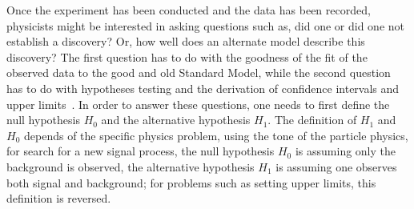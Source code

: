 \label{sec:stats}
Once the experiment has been conducted and the data has been recorded, 
physicists might be interested in asking questions such as,
did one or did one not establish a discovery? Or,
how well does an alternate model describe this discovery?
The first question has to do with the goodness of the fit of the 
observed data to the good and old Standard Model,
while the second question has to do with hypotheses testing and the derivation of 
confidence intervals and upper limits~\cite{Stats-for-pedestrian}.
In order to answer these questions, one needs to first define the null hypothesis $H_0$ and
the alternative hypothesis $H_1$.
The definition of $H_1$ and $H_0$ depends of the specific physics problem, using the tone
of the particle physics, for search for a new signal process, the null hypothesis $H_0$ is 
assuming only the background is observed, the alternative hypothesis $H_1$ is assuming 
one observes both signal and background; for problems such as setting upper limits,
this definition is reversed.

